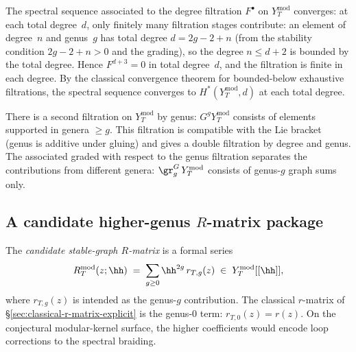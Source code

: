 \begin{remark}
The spectral sequence associated to the degree filtration
$F^\bullet$ on $Y_T^{\mathrm{mod}}$ converges: at each total degree~$d$, only finitely many filtration
stages contribute: an element of degree~$n$ and genus~$g$ has
total degree $d = 2g - 2 + n$ (from the stability condition
$2g - 2 + n > 0$ and the grading), so the degree $n \le d + 2$
is bounded by the total degree. Hence $F^{d+3} = 0$ in total
degree~$d$, and the filtration is finite in each degree. By the
classical convergence theorem for bounded-below exhaustive
filtrations, the spectral sequence converges to $H^\ast(Y_T^{\mathrm{mod}}, d)$
at each total degree.
\end{remark}

\begin{remark}
There is a second filtration on $Y_T^{\mathrm{mod}}$ by genus:
$G^g Y_T^{\mathrm{mod}}$ consists of elements supported in genera
$\ge g$. This filtration is compatible with the Lie bracket (genus
is additive under gluing) and gives a double filtration by degree
and genus. The associated graded with respect to the genus
filtration separates the contributions from different genera:
$\gr^G_g\, Y_T^{\mathrm{mod}}$ consists of genus-$g$ graph sums
only.
\end{remark}

\subsection{A candidate higher-genus $R$-matrix package}

\begin{definition}
The \emph{candidate stable-graph $R$-matrix} is a formal series
\begin{equation}
R_T^{\mathrm{mod}}(z; \hh)
\;=\;
\sum_{g \ge 0} \hh^{2g}\, r_{T,g}(z)
\;\in\;
Y_T^{\mathrm{mod}}[[\hh]],
\end{equation}
where $r_{T,g}(z)$ is intended as the genus-$g$ contribution. The classical
$r$-matrix of \S\ref{sec:classical-r-matrix-explicit} is the
genus-$0$ term: $r_{T,0}(z) = r(z)$. On the conjectural modular-kernel
surface, the higher coefficients would encode loop corrections to the
spectral braiding.
\end{definition}

